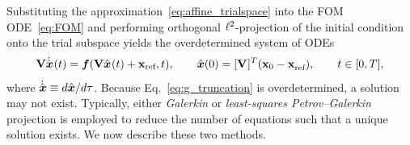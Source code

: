 \documentclass[3p,computermodern,10pt]{elsarticle}
\begin{document}
Substituting the approximation~\eqref{eq:affine_trialspace} into the FOM ODE~\eqref{eq:FOM} and performing orthogonal
$\ell^2$-projection of the initial condition onto the trial subspace yields
the overdetermined system of ODEs
\begin{equation}\label{eq:g_truncation}
\mathbf {V} \dot{\hat{ \boldsymbol x}}^{}(t) = \boldsymbol f(\mathbf {V}
\hat{ \boldsymbol x}^{}(t) + \mathbf{x}_\text{ref},t ), \qquad \hat{ \boldsymbol x}(0) = [\mathbf {V}^{}]^T( {{\mathbf{x}}_0} - \mathbf{x}_\text{ref}^{}),
	\qquad t \in [0,T],
\end{equation}
where $\dot{\hat{ \boldsymbol x}}\equiv {d \hat{ \boldsymbol x}}/{d\tau}$.
Because Eq.~\eqref{eq:g_truncation} is overdetermined, a solution may not
exist. Typically, either \textit{Galerkin} or \textit{least-squares
Petrov--Galerkin} projection is employed to reduce the number of equations
such that a unique solution exists. We now describe these two methods.
\end{document}
